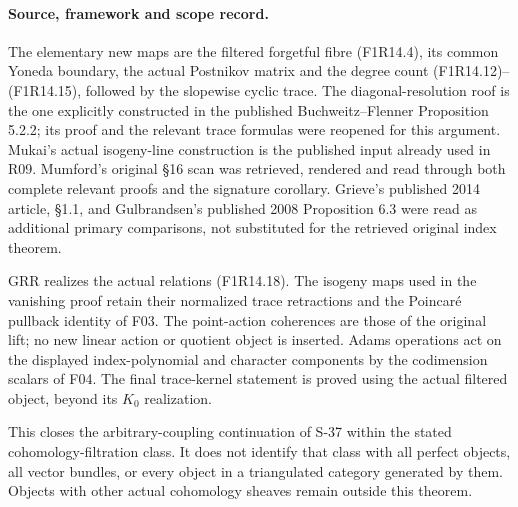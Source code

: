 \paragraph{Source, framework and scope record.}
The elementary new maps are the filtered forgetful fibre
(F1R14.4), its common Yoneda boundary, the actual Postnikov
matrix and the degree count (F1R14.12)--(F1R14.15), followed
by the slopewise cyclic trace. The diagonal-resolution roof
is the one explicitly constructed in the published
Buchweitz--Flenner Proposition 5.2.2; its proof and the
relevant trace formulas were reopened for this argument.
Mukai's actual isogeny-line construction is the published
input already used in R09. Mumford's original \S16 scan
was retrieved, rendered and read through both complete
relevant proofs and the signature corollary. Grieve's
published 2014 article, \S1.1, and Gulbrandsen's published
2008 Proposition 6.3 were read as additional primary
comparisons, not substituted for the retrieved original
index theorem.

GRR realizes the actual relations (F1R14.18). The isogeny
maps used in the vanishing proof retain their normalized
trace retractions and the Poincar\'e pullback identity of
F03. The point-action coherences are those of the original
lift; no new linear action or quotient object is inserted.
Adams operations act on the displayed index-polynomial
and character components by the codimension scalars of
F04. The final trace-kernel statement is proved using
the actual filtered object, beyond its $K_0$ realization.

This closes the arbitrary-coupling continuation of S-37
within the stated cohomology-filtration class. It does
not identify that class with all perfect objects, all
vector bundles, or every object in a triangulated category
generated by them. Objects with other actual cohomology
sheaves remain outside this theorem.
